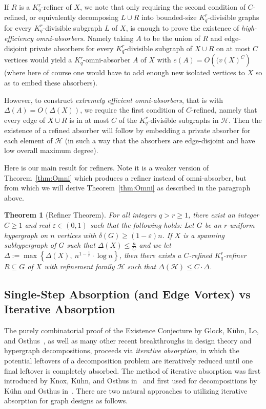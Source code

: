 \documentclass[11pt]{article}
\newcounter{i}
\theoremstyle{plain}
\newtheorem{thm}{Theorem}[section]
\theoremstyle{plain} %
\theoremstyle{definition}
\begin{document}
If $R$ is a $K_q^r$-refiner of $X$, we note that only requiring the second condition of $C$-refined, or equivalently decomposing $L\cup R$ into bounded-size $K_q^r$-divisible graphs for every $K_q^r$-divisible subgraph $L$ of $X$, is enough to prove the existence of \emph{high-efficiency omni-absorbers}.  Namely taking $A$ to be the union of $R$ and edge-disjoint private absorbers for every $K_q^r$-divisible subgraph of $X\cup R$ on at most $C$ vertices would yield a $K_q^r$-omni-absorber $A$ of $X$ with $e(A) = O\left( ( v(X)^C\right)$ (where here of course one would have to add enough new isolated vertices to $X$ so as to embed these absorbers).  

However, to construct \emph{extremely efficient omni-absorbers}, that is with $\Delta(A) = O(\Delta(X))$, we require the first condition of $C$-refined, namely that every edge of $X\cup R$ is in at most $C$ of the $K_q^r$-divisible subgraphs in $\mathcal{H}$. Then the existence of a refined absorber will follow by embedding a private absorber for each element of $\mathcal{H}$ (in such a way that the absorbers are edge-disjoint and have low overall maximum degree). 

Here is our main result for refiners. Note it is a weaker version of Theorem~\ref{thm:Omni} which produces a refiner instead of omni-absorber, but from which we will derive Theorem~\ref{thm:Omni} as described in the paragraph above.

\begin{thm}[Refiner Theorem]\label{thm:Refiner}
 For all integers $q> r\ge 1$, there exist an integer $C\ge 1$ and real $\varepsilon \in (0,1)$ such that the following holds: Let $G$ be an $r$-uniform hypergraph on $n$ vertices with $\delta(G)\ge (1-\varepsilon)n$. If $X$ is a spanning subhypergraph of $G$ such that $\Delta(X) \le \frac{n}{C}$ and we let $\Delta:= \max\left\{\Delta(X),~n^{1-\frac{1}{r}}\cdot \log n\right\}$, then there exists a $C$-refined $K_q^r$-refiner $R\subseteq G$ of $X$ with refinement family $\mathcal{H}$ such that $\Delta(\mathcal{H}) \le C \cdot \Delta$.
\end{thm}


\subsection{Single-Step Absorption (and Edge Vortex) vs Iterative Absorption}\label{ss:Vortex}


The purely combinatorial proof of the Existence Conjecture by Glock, K\"{u}hn, Lo, and Osthus~\cite{GKLO16}, as well as many other recent breakthroughs in design theory and hypergraph decompositions, proceeds via \emph{iterative absorption}, in which the potential leftovers of a decomposition problem are iteratively reduced until one final leftover is completely absorbed. The method of iterative absorption was first introduced by Knox, K\"{u}hn, and Osthus in~\cite{KKO15} and first used for decompositions by K\"{u}hn and Osthus in~\cite{KO13}. There are two natural approaches to utilizing iterative absorption for graph designs as follows. 
\end{document}
